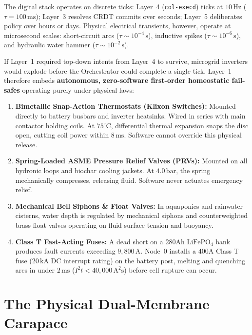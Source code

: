 The digital stack operates on discrete ticks: Layer~4 (\texttt{col-execd}) ticks at $10\,\mathrm{Hz}$ ($\tau = 100\,\mathrm{ms}$); Layer~3 resolves CRDT commits over seconds; Layer~5 deliberates policy over hours or days. Physical electrical transients, however, operate at microsecond scales: short-circuit arcs ($\tau \sim 10^{-4}\,\mathrm{s}$), inductive spikes ($\tau \sim 10^{-6}\,\mathrm{s}$), and hydraulic water hammer ($\tau \sim 10^{-2}\,\mathrm{s}$).

If Layer~1 required top-down intents from Layer~4 to survive, microgrid inverters would explode before the Orchestrator could complete a single tick. Layer~1 therefore embeds \textbf{autonomous, zero-software first-order homeostatic fail-safes} operating purely under physical laws:
\begin{enumerate}
    \item \textbf{Bimetallic Snap-Action Thermostats (Klixon Switches):} Mounted directly to battery busbars and inverter heatsinks. Wired in series with main contactor holding coils. At $75^\circ\mathrm{C}$, differential thermal expansion snaps the disc open, cutting coil power within $8\,\mathrm{ms}$. Software cannot override this physical release.
    \item \textbf{Spring-Loaded ASME Pressure Relief Valves (PRVs):} Mounted on all hydronic loops and biochar cooling jackets. At $4.0\,\mathrm{bar}$, the spring mechanically compresses, releasing fluid. Software never actuates emergency relief.
    \item \textbf{Mechanical Bell Siphons \& Float Valves:} In aquaponics and rainwater cisterns, water depth is regulated by mechanical siphons and counterweighted brass float valves operating on fluid surface tension and buoyancy.
    \item \textbf{Class T Fast-Acting Fuses:} A dead short on a 280Ah $\mathrm{LiFePO}_4$ bank produces fault currents exceeding $9,800\,\mathrm{A}$. Node~0 installs a 400A Class T fuse ($20\,\mathrm{kA}$ DC interrupt rating) on the battery post, melting and quenching arcs in under $2\,\mathrm{ms}$ ($I^2 t < 40,000\,\mathrm{A^2 s}$) before cell rupture can occur.
\end{enumerate}

\section{The Physical Dual-Membrane Carapace}
\label{sec:l1_dual_membrane}

